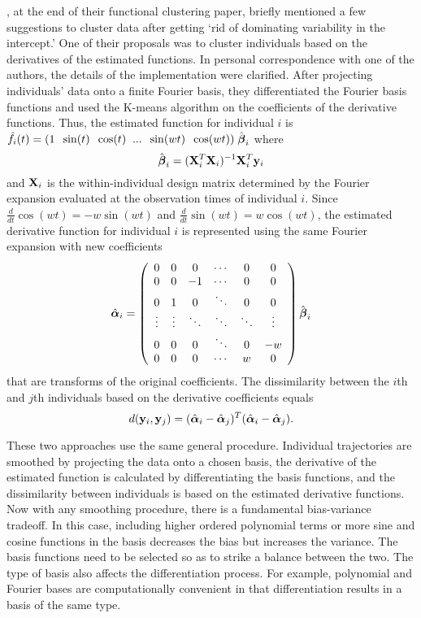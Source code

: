 \Textcite{tarpey2003}, at the end of their functional clustering paper, briefly mentioned a few suggestions to cluster data after getting `rid of dominating variability in the intercept.' One of their proposals was to cluster individuals based on the derivatives of the estimated functions. In personal correspondence with one of the authors, the details of the implementation were clarified. After projecting individuals' data onto a finite Fourier basis, they differentiated the Fourier basis functions and used the K-means algorithm on the coefficients of the derivative functions. Thus, the estimated function for individual $i$ is $\hat{f}_{i}(t)= (1\;\; \sin(t)\;\;\cos(t)\;\;...\;\;\sin(wt)\;\;\cos(wt))\;\hat{\boldsymbol\beta}_{i}$ where
$$\hat{\boldsymbol\beta}_{i} = (\mathbf X^{T}_{i}\mathbf X_{i})^{-1}\mathbf X^{T}_{i}\mathbf y_{i}$$
and $\mathbf X_{i}$ is the within-individual design matrix determined by the Fourier expansion evaluated at the observation times of individual $i$. Since $\frac{d}{dt}\cos(wt) = -w\sin(wt)$ and $\frac{d}{dt}\sin(wt) = w\cos(wt)$, the estimated derivative function for individual $i$ is represented using the same Fourier expansion with new coefficients 
$$\hat{\boldsymbol\alpha}_{i} = \left(\begin{array}{cccccc}
0 & 0&0&\cdots&0&0\\
0&0&-1&\cdots&0&0\\
0&1&0&\ddots&0&0\\
\vdots&\vdots&\ddots&\ddots&\ddots&\vdots\\
0&0&0&\ddots&0&-w\\
0&0&0&\cdots&w&0\end{array}\right)\hat{\boldsymbol\beta}_{i}$$
that are transforms of the original coefficients. The dissimilarity between the $i$th and $j$th individuals based on the derivative coefficients equals
$$d(\mathbf y_{i},\mathbf y_{j}) = (\hat{\boldsymbol\alpha}_{i}-\hat{\boldsymbol\alpha}_{j})^{T}(\hat{\boldsymbol\alpha}_{i}-\hat{\boldsymbol\alpha}_{j}).$$

These two approaches use the same general procedure. Individual trajectories are smoothed by projecting the data onto a chosen basis, the derivative of the estimated function is calculated by differentiating the basis functions, and the dissimilarity between individuals is based on the estimated derivative functions. Now with any smoothing procedure, there is a fundamental bias-variance tradeoff. In this case, including higher ordered polynomial terms or more sine and cosine functions in the basis decreases the bias but increases the variance. The basis functions need to be selected so as to strike a balance between the two. The type of basis also affects the differentiation process. For example, polynomial and Fourier bases are computationally convenient in that differentiation results in a basis of the same type.

